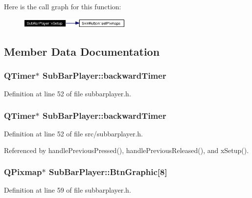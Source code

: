 Here is the call graph for this function:\begin{figure}[H]
\begin{center}
\leavevmode
\includegraphics[width=156pt]{classSubBarPlayer_SubBarPlayera2_cgraph}
\end{center}
\end{figure}


\subsection{Member Data Documentation}
\subsubsection{\setlength{\rightskip}{0pt plus 5cm}QTimer$\ast$ {\bf Sub\-Bar\-Player::backward\-Timer}}\label{classSubBarPlayer_SubBarPlayero13}




Definition at line 52 of file subbarplayer.h.
\subsubsection{\setlength{\rightskip}{0pt plus 5cm}QTimer$\ast$ {\bf Sub\-Bar\-Player::backward\-Timer}}\label{classSubBarPlayer_SubBarPlayero3}




Definition at line 52 of file src/subbarplayer.h.

Referenced by handle\-Previous\-Pressed(), handle\-Previous\-Released(), and x\-Setup().
\subsubsection{\setlength{\rightskip}{0pt plus 5cm}QPixmap$\ast$ {\bf Sub\-Bar\-Player::Btn\-Graphic}[8]\hspace{0.3cm}{\tt  [private]}}\label{classSubBarPlayer_SubBarPlayerr4}




Definition at line 59 of file subbarplayer.h.
